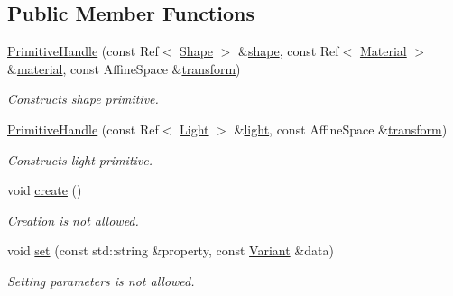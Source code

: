 \subsection*{Public Member Functions}
\begin{DoxyCompactItemize}
\item 
\hyperlink{classembree_1_1_primitive_handle_a158bfc7b85bbb53ddb4f45a0b34f9719}{PrimitiveHandle} (const Ref$<$ \hyperlink{classembree_1_1_shape}{Shape} $>$ \&\hyperlink{classembree_1_1_primitive_handle_a5e41b912766d99fe26a76b67e57e8a66}{shape}, const Ref$<$ \hyperlink{classembree_1_1_material}{Material} $>$ \&\hyperlink{classembree_1_1_primitive_handle_a0fc57652da580a13c6b0da9ffc3b8bf4}{material}, const AffineSpace \&\hyperlink{classembree_1_1_primitive_handle_af719dfb6ffb4227d36d0d838be649325}{transform})
\begin{DoxyCompactList}\small\item\em Constructs shape primitive. \item\end{DoxyCompactList}\item 
\hyperlink{classembree_1_1_primitive_handle_ac365ebe1df7fcef94065dff7e2be1f4c}{PrimitiveHandle} (const Ref$<$ \hyperlink{classembree_1_1_light}{Light} $>$ \&\hyperlink{classembree_1_1_primitive_handle_a12cc18cebf95189241fe315c031307e0}{light}, const AffineSpace \&\hyperlink{classembree_1_1_primitive_handle_af719dfb6ffb4227d36d0d838be649325}{transform})
\begin{DoxyCompactList}\small\item\em Constructs light primitive. \item\end{DoxyCompactList}\item 
void \hyperlink{classembree_1_1_primitive_handle_ae730fb9b00684388aab1542bd95f71e6}{create} ()
\begin{DoxyCompactList}\small\item\em Creation is not allowed. \item\end{DoxyCompactList}\item 
void \hyperlink{classembree_1_1_primitive_handle_ac7fac33f0838f97732fa61cab03f75bd}{set} (const std::string \&property, const \hyperlink{structembree_1_1_variant}{Variant} \&data)
\begin{DoxyCompactList}\small\item\em Setting parameters is not allowed. \item\end{DoxyCompactList}\end{DoxyCompactItemize}
